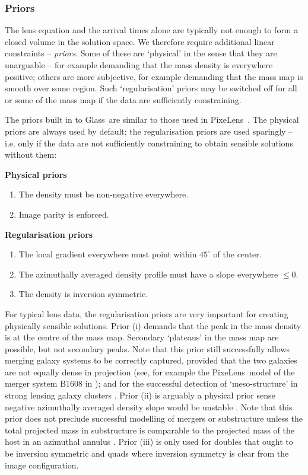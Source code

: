 \documentclass[galley,usenatbib]{mn2e}
\newcommand{\Glass}{{\sc Glass}}
\newcommand{\PixeLens}{{\sc PixeLens}}
\begin{document}
\subsubsection{Priors}

The lens equation and the arrival times alone are typically not enough to form
a closed volume in the solution space. We therefore require additional linear
constraints -- {\it priors}. Some of these are `physical' in the sense that
they are unarguable -- for example demanding that the mass density is
everywhere positive; others are more subjective, for example demanding that the
mass map is smooth over some region. Such `regularisation' priors may be
switched off for all or some of the mass map if the data are sufficiently
constraining. 

The priors built in to \Glass\ are similar to those used in \PixeLens\
\citep{2008ApJ...679...17C}. The physical priors are always used by default;
the regularisation priors are used sparingly -- i.e. only if the data are not
sufficiently constraining to obtain sensible solutions without them:  

%
\vspace{2mm}
\noindent
{\bf Physical priors}
\begin{enumerate}
\item The density must be non-negative everywhere.
\item Image parity is enforced.
\end{enumerate}

\vspace{1mm}
\noindent
{\bf Regularisation priors}
\begin{enumerate}
\item The local gradient everywhere must point within $45^{\circ}$ of the center.
\item The azimuthally averaged density profile must have a slope everywhere $\le 0$.
\item The density is inversion symmetric.
\end{enumerate}
%
For typical lens data, the regularisation priors are very important for
creating physically sensible solutions. Prior (i) demands that the peak in the
mass density is at the centre of the mass map. Secondary `plateaus' in the mass
map are possible, but not secondary peaks. Note that this prior still
successfully allows merging galaxy systems to be correctly captured, provided
that the two galaxies are not equally dense in projection (see, for example the
\PixeLens\ model of the merger system B1608 in \citealt{2007ApJ...667..645R});
and for the successful detection of `meso-structure' in strong lensing galaxy
clusters \citep{2007ApJ...663...29S}. Prior (ii) is arguably a physical prior
sense negative azimuthally averaged density slope would be unstable
\citep[e.g.][]{2008gady.book.....B}. Note that this prior does not preclude
successful modelling of mergers or substructure unless the total projected mass
in substructure is comparable to the projected mass of the host in an azimuthal
annulus \citep{2007ApJ...667..645R,2007ApJ...663...29S}. Prior (iii) is only
used for doubles that ought to be inversion symmetric and quads where inversion
symmetry is clear from the image configuration.
\end{document}
